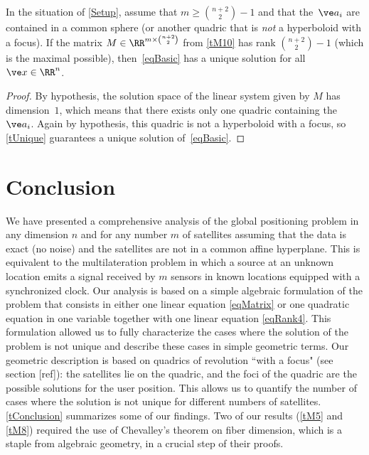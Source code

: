 \documentclass[reqno]{amsart}
\begin{document}
\begin{theorem} \label{tM9}%
  In the situation of \cref{Setup}, assume that $m \ge \binom{n+2}{2}
  - 1$ and that the~$\ve a_i$ are contained in a common sphere (or
  another quadric that is {\em not} a hyperboloid with a focus). If
  the matrix $M \in \RR^{m \times \binom{n+2}{2}}$ from \cref{tM10}
  has rank $\binom{n+2}{2}-1$ (which is the maximal possible),
  then~\eqref{eqBasic} has a unique solution for all~$\ve x \in
  \RR^n$.
\end{theorem}

\begin{proof}
  By hypothesis, the solution space of the linear system given by $M$
  has dimension~$1$, which means that there exists only one quadric
  containing the~$\ve a_i$. Again by hypothesis, this quadric is not a
  hyperboloid with a focus, so \cref{tUnique} guarantees a unique
  solution of~\eqref{eqBasic}.
\end{proof}

\section{Conclusion} \label{sConclusion}
We have presented a comprehensive analysis of the global positioning problem in any dimension $n$ and for any number $m$ of satellites assuming that the data is exact (no noise) and the satellites are not in a common affine hyperplane. This is equivalent to the multilateration problem in which a source at an unknown location emits a signal received by $m$ sensors in known locations equipped with a synchronized clock.
Our analysis is based on a simple algebraic formulation of the problem that consists in either one linear equation \eqref{eqMatrix} or one quadratic equation in one variable together with one linear equation \eqref{eqRank4}. This formulation allowed us to fully characterize the cases where the solution of the problem is not unique and describe these cases in simple geometric terms. Our geometric description is based on quadrics of revolution ``with a focus" (see section [ref]): the satellites lie on the quadric, and  the foci of the quadric are the possible solutions for the user position. This allows us to quantify the number of cases where the solution is not unique for different numbers of satellites.
 \cref{tConclusion} summarizes some of our findings. %
Two of our results (\cref{tM5} and \cref{tM8}) required the use of Chevalley's theorem on fiber dimension, which is a staple from algebraic geometry, in a crucial step of their proofs.
 
\end{document}
